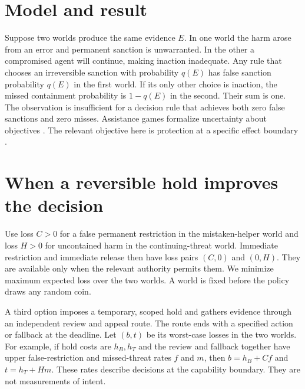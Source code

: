 \documentclass[11pt]{article}
\begin{document}
\section{Model and result}
Suppose two worlds produce the same evidence $E$. In one world the harm arose from an error and permanent sanction is unwarranted. In the other a compromised agent will continue, making inaction inadequate. Any rule that chooses an irreversible sanction with probability $q(E)$ has false sanction probability $q(E)$ in the first world. If its only other choice is inaction, the missed containment probability is $1-q(E)$ in the second. Their sum is one. The observation is insufficient for a decision rule that achieves both zero false sanctions and zero misses. Assistance games formalize uncertainty about objectives \cite{cirl}. The relevant objective here is protection at a specific effect boundary \cite{saltzer}.

\section{When a reversible hold improves the decision}
Use loss $C>0$ for a false permanent restriction in the
mistaken-helper world and loss $H>0$ for uncontained harm
in the continuing-threat world. Immediate restriction and
immediate release then have loss pairs $(C,0)$ and $(0,H)$.
They are available only when the relevant authority permits them.
We minimize maximum expected loss over the two worlds. A world
is fixed before the policy draws any random coin.

A third option imposes a temporary, scoped hold and gathers
evidence through an independent review and appeal route.
The route ends with a specified action or fallback at the
deadline. Let $(b,t)$ be its worst-case losses in the two worlds.
For example, if hold costs are $h_B,h_T$ and the review and
fallback together have upper false-restriction and missed-threat
rates $f$ and $m$, then $b=h_B+Cf$ and $t=h_T+Hm$. These
rates describe decisions at the capability boundary. They are
not measurements of intent.
\end{document}
